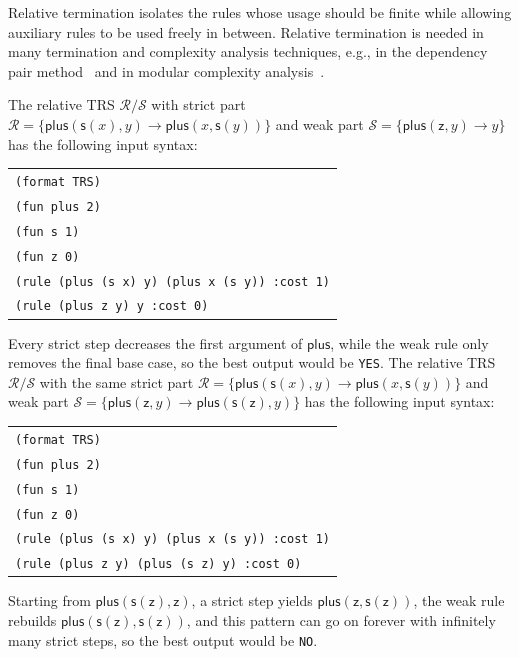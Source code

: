 \begin{motivation}
Relative termination isolates the rules whose usage should be finite while allowing auxiliary rules to be used freely in between.
Relative termination is needed in many termination and complexity analysis techniques, e.g., in the dependency pair method~\cite{arts2000TerminationTermRewriting,giesl2006MechanizingImprovingDependency} and in modular complexity analysis~\cite{zankl2014ModularComplexityAnalysis}.
\end{motivation}

\begin{example}
The relative TRS $\mathcal{R}/\mathcal{S}$ with strict part 
$\mathcal{R} = \{\mathsf{plus}(\mathsf{s}(x), y) \to \mathsf{plus}(x,\mathsf{s}(y))\}$ 
and weak part $\mathcal{S} = \{\mathsf{plus}(\mathsf{z}, y) \to y\}$ has the following input syntax:
\begin{center}
\begin{tabular}{l}
\texttt{(format TRS)} \\
\texttt{(fun plus 2)} \\
\texttt{(fun s 1)} \\
\texttt{(fun z 0)} \\
\texttt{(rule (plus (s x) y) (plus x (s y)) :cost 1)} \\
\texttt{(rule (plus z y) y :cost 0)}
\end{tabular}
\end{center}
Every strict step decreases the first argument of $\mathsf{plus}$, 
while the weak rule only removes the final base case, so the best output would be \texttt{YES}.
The relative TRS $\mathcal{R}/\mathcal{S}$ with the same strict part 
$\mathcal{R} = \{\mathsf{plus}(\mathsf{s}(x), y) \to \mathsf{plus}(x,\mathsf{s}(y))\}$ and weak part 
$\mathcal{S} = \{\mathsf{plus}(\mathsf{z}, y) \to \mathsf{plus}(\mathsf{s}(\mathsf{z}), y)\}$ has the following input syntax:
\begin{center}
\begin{tabular}{l}
\texttt{(format TRS)} \\
\texttt{(fun plus 2)} \\
\texttt{(fun s 1)} \\
\texttt{(fun z 0)} \\
\texttt{(rule (plus (s x) y) (plus x (s y)) :cost 1)} \\
\texttt{(rule (plus z y) (plus (s z) y) :cost 0)}
\end{tabular}
\end{center}
Starting from $\mathsf{plus}(\mathsf{s}(\mathsf{z}),\mathsf{z})$, 
a strict step yields $\mathsf{plus}(\mathsf{z},\mathsf{s}(\mathsf{z}))$, 
the weak rule rebuilds $\mathsf{plus}(\mathsf{s}(\mathsf{z}),\mathsf{s}(\mathsf{z}))$, 
and this pattern can go on forever with infinitely many strict steps, so the best output would be \texttt{NO}.
\end{example}

